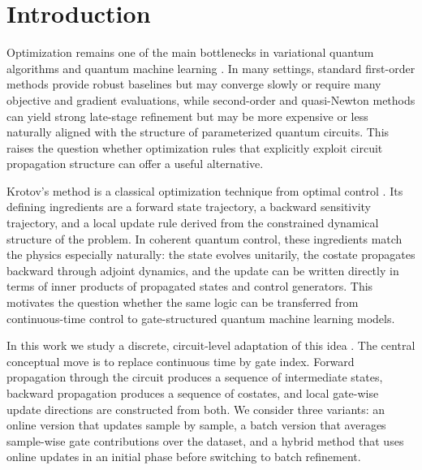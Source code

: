 \documentclass[aps,prb,10pt,twocolumn,superscriptaddress]{revtex4-2}
\begin{document}
\maketitle
\section{Introduction}

Optimization remains one of the main bottlenecks in variational quantum algorithms and quantum machine learning \cite{CerezoEtAl2021VQA,McCleanEtAl2016Theory,MollEtAl2018QST,BiamonteEtAl2017QML,KandalaEtAl2017HEA,McCleanEtAl2018Barren,WangEtAl2021NoiseBP}. In many settings, standard first-order methods provide robust baselines but may converge slowly or require many objective and gradient evaluations, while second-order and quasi-Newton methods can yield strong late-stage refinement but may be more expensive or less naturally aligned with the structure of parameterized quantum circuits. This raises the question whether optimization rules that explicitly exploit circuit propagation structure can offer a useful alternative.

Krotov's method is a classical optimization technique from optimal control \cite{KonnovKrotov1999,WerschnikGross2007,BrifChakrabartiRabitz2010,PalaoKosloff2003,ReichNdongKoch2012,GoerzEtAl2019Krotov}. Its defining ingredients are a forward state trajectory, a backward sensitivity trajectory, and a local update rule derived from the constrained dynamical structure of the problem. In coherent quantum control, these ingredients match the physics especially naturally: the state evolves unitarily, the costate propagates backward through adjoint dynamics, and the update can be written directly in terms of inner products of propagated states and control generators. This motivates the question whether the same logic can be transferred from continuous-time control to gate-structured quantum machine learning models.

In this work we study a discrete, circuit-level adaptation of this idea \cite{SchuldEtAl2019Gradients,BanchiCrooks2021SPSR,WierichsEtAl2022ShiftRules}. The central conceptual move is to replace continuous time by gate index. Forward propagation through the circuit produces a sequence of intermediate states, backward propagation produces a sequence of costates, and local gate-wise update directions are constructed from both. We consider three variants: an online version that updates sample by sample, a batch version that averages sample-wise gate contributions over the dataset, and a hybrid method that uses online updates in an initial phase before switching to batch refinement.
\end{document}
